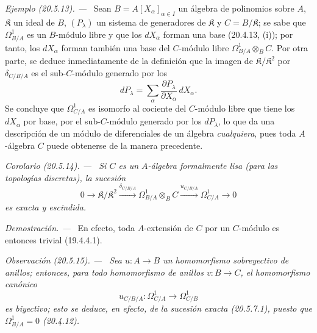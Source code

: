 \documentclass[10pt,oneside]{book}
\makeatletter
\newcommand{\setmanualcurrentlabel}[1]{\def\@currentlabel{#1}}
\newcommand{\oldpage}[2][]{%
  \setcounter{footnote}{0}%
  \marginpar{\scriptsize\textbf{#1}~|~#2}\ignorespaces}
\newenvironment{corollary}[1][]{%
  \setmanualcurrentlabel{#1}\par\medskip\noindent\itshape Corolario (#1). ---\ }{\par}
\newenvironment{remark}[1][]{%
  \setmanualcurrentlabel{#1}\par\medskip\noindent\itshape Observación (#1). ---\ }{\par}
\newenvironment{example}[1][]{%
  \setmanualcurrentlabel{#1}\par\medskip\noindent\textit{Ejemplo (#1). ---}\ }{\par}
\newenvironment{proof}{%
  \par\medskip\noindent\textit{Demostración. ---\ }}{\par}
\makeatother
\begin{document}
\begin{example}[20.5.13]
\label{0.20.5.13-es}
Sean $B=A[X_\alpha]_{\alpha\in I}$ un álgebra de polinomios sobre $A$,
$\mathfrak K$ un ideal de $B$, $(P_\lambda)$ un sistema de generadores
de $\mathfrak K$ y $C=B/\mathfrak K$; se sabe que
$\Omega^1_{B/A}$ es un $B$-módulo libre y que los $dX_\alpha$ forman una
base (20.4.13, (i)); por tanto, los $dX_\alpha$ forman también una base del
$C$-módulo libre $\Omega^1_{B/A}\otimes_B C$. Por otra parte, se deduce
inmediatamente de la definición que la imagen de
$\mathfrak K/\mathfrak K^2$ por $\delta_{C/B/A}$ es el sub-$C$-módulo
generado por los
\[
  dP_\lambda=\sum_\alpha
  \frac{\partial P_\lambda}{\partial X_\alpha}\,dX_\alpha.
\]
Se concluye que $\Omega^1_{C/A}$ es isomorfo al cociente del
$C$-módulo libre que tiene los $dX_\alpha$ por base, por el sub-$C$-módulo
generado por los $dP_\lambda$, lo que da una descripción de un módulo
de diferenciales de un álgebra \emph{cualquiera}, pues toda $A$-álgebra
$C$ puede obtenerse de la manera precedente.
\end{example}

\begin{corollary}[20.5.14]
\label{0.20.5.14-es}
Si $C$ es un $A$-álgebra formalmente lisa (para las topologías
discretas), la sucesión
\begin{equation}
\tag{20.5.14.1}
\label{0.20.5.14.1-es}
  0\longrightarrow\mathfrak K/\mathfrak K^2
  \xrightarrow{\delta_{C/B/A}}\Omega^1_{B/A}\otimes_B C
  \xrightarrow{u_{C/B/A}}\Omega^1_{C/A}\longrightarrow0
\end{equation}
es exacta y escindida.
\end{corollary}

\begin{proof}
En efecto, toda $A$-extensión de $C$ por un $C$-módulo es entonces trivial
(19.4.4.1).
\end{proof}

\oldpage[0\textsubscript{IV-1}]{136}
\begin{remark}[20.5.15]
\label{0.20.5.15-es}
Sea $u:A\to B$ un homomorfismo \emph{sobreyectivo} de anillos; entonces, para
todo homomorfismo de anillos $v:B\to C$, el homomorfismo canónico
\begin{equation}
\tag{20.5.15.1}
\label{0.20.5.15.1-es}
  u_{C/B/A}:\Omega^1_{C/A}\longrightarrow\Omega^1_{C/B}
\end{equation}
es \emph{biyectivo}; esto se deduce, en efecto, de la sucesión exacta (20.5.7.1),
puesto que $\Omega^1_{B/A}=0$ (20.4.12).
\end{remark}
\end{document}

